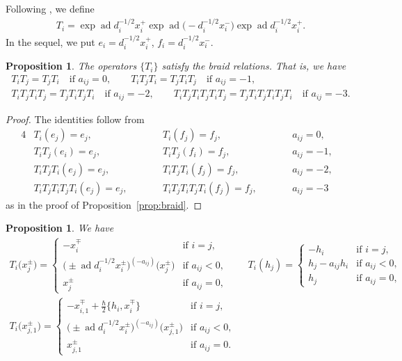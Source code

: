 \documentclass[10pt,a4paper]{amsart}
\newtheorem{prop}[thm]{Proposition}
\theoremstyle{definition}
\numberwithin{equation}{section}
\DeclareMathOperator{\ad}{ad}
\begin{document}
Following \cite{MR3861718}, we define
\begin{gather*}
T_i = \exp\ad d_i^{-1/2}x_i^+ \exp\ad \big({-}d_i^{-1/2}x_i^-\big) \exp\ad d_i^{-1/2}x_i^+.
\end{gather*}
In the sequel, we put $e_i = d_i^{-1/2}x_i^+$, $f_i=d_i^{-1/2}x_i^-$.
\begin{prop}
The operators $\{T_i\}$ satisfy the braid relations. That is, we have
\begin{gather*}
T_i T_j = T_j T_i \quad \text{if $a_{ij}=0$},\qquad T_i T_j T_i = T_j T_i T_j \quad \text{if $a_{ij}=-1$},\\
T_i T_j T_i T_j = T_j T_i T_j T_i \quad \text{if $a_{ij}=-2$},\qquad T_i T_j T_i T_j T_i T_j = T_j T_i T_j T_i T_j T_i \quad \text{if $a_{ij}=-3$}.
\end{gather*}
\end{prop}
\begin{proof}The identities follow from
\begin{alignat*}{4}
& T_i(e_j) = e_j, \qquad && T_i(f_j) = f_j, \qquad && a_{ij}=0,& \\
& T_i T_j (e_i) = e_j, \qquad && T_i T_j (f_i) = f_j, \qquad && a_{ij}=-1,& \\
& T_i T_j T_i (e_j) = e_j, \qquad && T_i T_j T_i (f_j) = f_j, \qquad && a_{ij}=-2,& \\
& T_i T_j T_i T_j T_i (e_j) = e_j, \qquad && T_i T_j T_i T_j T_i (f_j) = f_j, \qquad && a_{ij}=-3 &
\end{alignat*}
as in the proof of Proposition~\ref{prop:braid}.
\end{proof}

\begin{prop}We have
\begin{gather*}
T_i\big(x_j^{\pm}\big) = \begin{cases}
-x_i^{\mp} & \text{if $i=j$},\\
\big({\pm} \ad d_i^{-1/2}x_i^{\pm}\big)^{(-a_{ij})}\big(x_j^{\pm}\big) & \text{if $a_{ij}<0$},\\
x_j^{\pm} & \text{if $a_{ij}=0$},
\end{cases}\qquad
T_i(h_j) = \begin{cases}
-h_i & \text{if $i=j$},\\
h_j - a_{ij} h_i & \text{if $a_{ij}<0$},\\
h_j & \text{if $a_{ij}=0$},
\end{cases}
\\
T_i\big(x_{j,1}^{\pm}\big) = \begin{cases}
-x_{i,1}^{\mp} + \tfrac{\hbar}{2}\big\{ h_i, x_i^{\mp} \big\} & \text{if $i=j$},\\
\big({\pm} \ad d_i^{-1/2} x_i^{\pm}\big)^{(-a_{ij})}\big(x_{j,1}^{\pm}\big) & \text{if $a_{ij} <0 $},\\
x_{j,1}^{\pm} & \text{if $a_{ij}=0$}.
\end{cases}
\end{gather*}
\end{prop}
\end{document}
